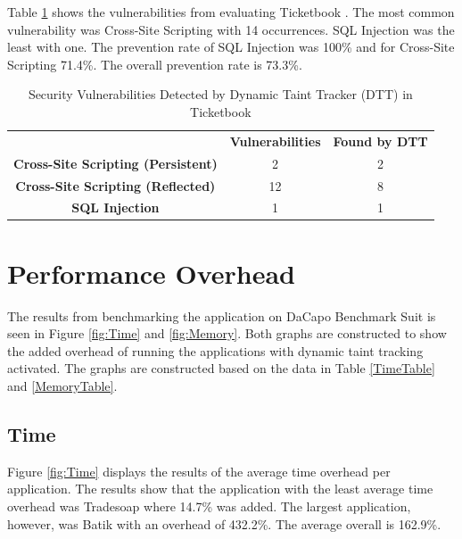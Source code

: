 Table \ref{table:Ticketbook} shows the vulnerabilities from evaluating Ticketbook \parencite{ticketbook}. The most common vulnerability was Cross-Site Scripting with 14 occurrences. SQL Injection was the least with one. The prevention rate of SQL Injection was 100\% and for Cross-Site Scripting 71.4\%. The overall prevention rate is 73.3\%.

\begin{table}[H]
  \centering
  \caption{Security Vulnerabilities Detected by Dynamic Taint Tracker (DTT) in Ticketbook}
  \label{table:Ticketbook}
  \begin{tabular}{ccc}
    & \textbf{Vulnerabilities} & \textbf{Found by DTT} \\
    \textbf{Cross-Site Scripting (Persistent)} & 2             & 2 \\
    \textbf{Cross-Site Scripting (Reflected)}  & 12            & 8 \\
    \textbf{SQL Injection}                     & 1             & 1
  \end{tabular}
\end{table}



\section{Performance Overhead}
\label{Performance}
The results from benchmarking the application on DaCapo Benchmark Suit \parencite{dacapo} is seen in Figure \ref{fig:Time} and \ref{fig:Memory}. Both graphs are constructed to show the added overhead of running the applications with dynamic taint tracking activated. The graphs are constructed based on the data in Table \ref{TimeTable} and \ref{MemoryTable}.



\subsection{Time}
Figure \ref{fig:Time} displays the results of the average time overhead per application. The results show that the application with the least average time overhead was Tradesoap where 14.7\% was added. The largest application, however, was Batik with an overhead of 432.2\%. The average overall is 162.9\%.

